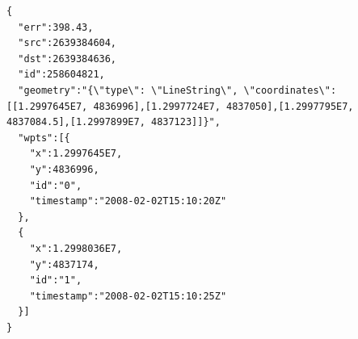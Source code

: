 \begin{lstlisting}[style=java, caption=Content of a simple link object., label=lst:geojson:link]
{
  "err":398.43,
  "src":2639384604,
  "dst":2639384636,
  "id":258604821,
  "geometry":"{\"type\": \"LineString\", \"coordinates\": [[1.2997645E7, 4836996],[1.2997724E7, 4837050],[1.2997795E7, 4837084.5],[1.2997899E7, 4837123]]}",
  "wpts":[{
    "x":1.2997645E7,
    "y":4836996,
    "id":"0",
    "timestamp":"2008-02-02T15:10:20Z"
  },
  {
    "x":1.2998036E7,
    "y":4837174,
    "id":"1",
    "timestamp":"2008-02-02T15:10:25Z"
  }]
}
\end{lstlisting}
